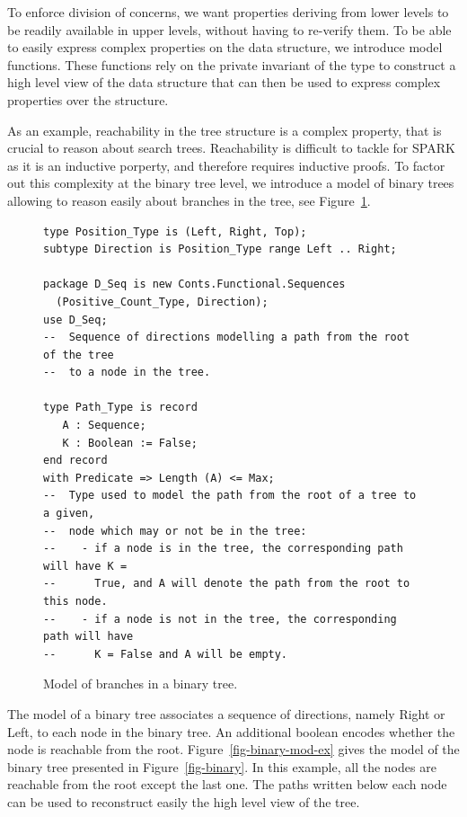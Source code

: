 \documentclass{llncs}
\newcommand{\spark}{SPARK\xspace}
\begin{document}
To enforce division of concerns, we want properties deriving from lower levels to
be readily available in upper levels, without having to re-verify them. To be
able to easily express complex properties on the data structure, we
introduce model functions. These functions rely on the private invariant of the type
to construct a high level view of the data structure that can then be used to express
complex properties over the structure.

As an example, reachability in the tree structure is a complex property, that is
crucial to reason about search trees. Reachability is difficult to tackle for \spark
as it is an inductive porperty, and therefore requires inductive proofs. To factor out
this complexity at the binary tree level, we introduce
a model of binary trees allowing to reason easily about branches in the tree, see
Figure~\ref{fig-binary-mod}.

\begin{figure}[ht]
\begin{small}
\begin{lstlisting}
type Position_Type is (Left, Right, Top);
subtype Direction is Position_Type range Left .. Right;

package D_Seq is new Conts.Functional.Sequences
  (Positive_Count_Type, Direction);
use D_Seq;
--  Sequence of directions modelling a path from the root of the tree
--  to a node in the tree.

type Path_Type is record
   A : Sequence;
   K : Boolean := False;
end record
with Predicate => Length (A) <= Max;
--  Type used to model the path from the root of a tree to a given,
--  node which may or not be in the tree:
--    - if a node is in the tree, the corresponding path will have K =
--      True, and A will denote the path from the root to this node.
--    - if a node is not in the tree, the corresponding path will have
--      K = False and A will be empty.
\end{lstlisting}
\end{small}
\caption{\label{fig-binary-mod} Model of branches in a binary tree.}
\end{figure}

The model of a binary tree associates a sequence of directions, namely
Right or Left, to each node in the binary tree. An additional boolean encodes
whether the node is reachable from the root. Figure~\ref{fig-binary-mod-ex} gives
the model of the binary tree presented in Figure~\ref{fig-binary}. In this
example, all the nodes are reachable from the root except the last one. The
paths written below each node can be used to reconstruct easily the high level
view of the tree.
\end{document}
